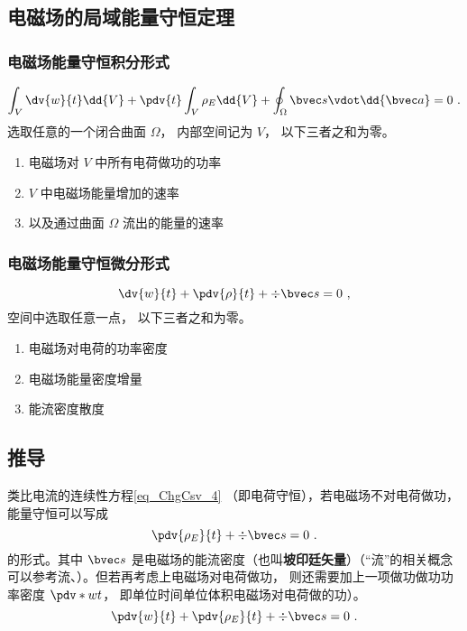 \subsection{电磁场的局域能量守恒定理}

\subsubsection{电磁场能量守恒积分形式}
\begin{equation}
\int_V \dv{w}{t} \dd{V}  + \pdv{t} \int_V \rho_E \dd{V}  + \oint_\Omega  \bvec s \vdot \dd{\bvec a}  = 0~.
\end{equation} 
选取任意的一个闭合曲面 $\Omega $， 内部空间记为 $V$， 以下三者之和为零。
\begin{enumerate}
\item 电磁场对 $V$ 中所有电荷做功的功率
\item $V$ 中电磁场能量增加的速率
\item 以及通过曲面 $\Omega $ 流出的能量的速率
\end{enumerate}

\subsubsection{电磁场能量守恒微分形式}
\begin{equation}
\dv{w}{t} + \pdv{\rho}{t} + \div \bvec s = 0~,
\end{equation} 
空间中选取任意一点， 以下三者之和为零。
\begin{enumerate}
\item 电磁场对电荷的功率密度
\item 电磁场能量密度增量
\item 能流密度散度
\end{enumerate}

\subsection{推导}
类比电流的连续性方程\autoref{eq_ChgCsv_4} （即电荷守恒），若电磁场不对电荷做功，能量守恒可以写成
\begin{equation}
\pdv{\rho_E}{t} + \div \bvec s = 0~.
\end{equation} 
的形式。其中 $\bvec s$ 是电磁场的能流密度（也叫\textbf{坡印廷矢量}）（“流”的相关概念可以参考流、）。但若再考虑上电磁场对电荷做功， 则还需要加上一项做功做功功率密度 $\pdv*{w}{t}$， 即单位时间单位体积电磁场对电荷做的功）。
\begin{equation}\label{eq_EBS_1}
\pdv{w}{t} + \pdv{\rho_E}{t} + \div \bvec s = 0~.
\end{equation} 

